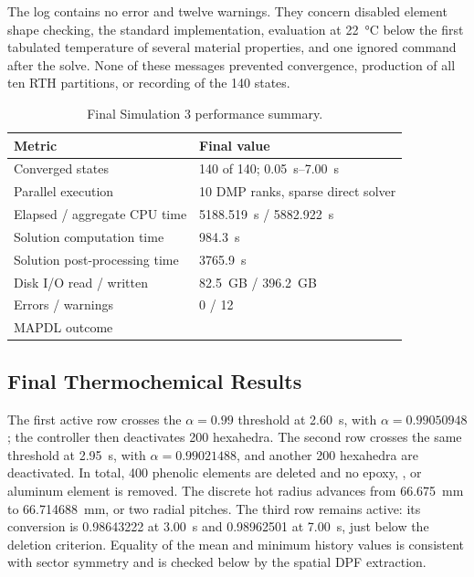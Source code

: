 \documentclass[oneside,openany]{amsdtx}
\begin{document}
The log contains no error and twelve warnings. They concern disabled element
shape checking, the standard  implementation, evaluation at
\SI{22}{\celsius} below the first tabulated temperature of several material
properties, and one ignored  command after the solve. None of
these messages prevented convergence, production of all ten RTH partitions,
or recording of the 140 states.

\begin{table}[H]
\centering
\small
\renewcommand{\arraystretch}{1.15}
\begin{tabular}{L{0.49\textwidth}L{0.37\textwidth}}
\toprule
\textbf{Metric} & \textbf{Final value} \\
\midrule
Converged states & 140 of 140; \SIrange{0.05}{7.00}{s} \\
Parallel execution & 10 DMP ranks, sparse direct solver \\
Elapsed / aggregate CPU time & \SI{5188.519}{s} / \SI{5882.922}{s} \\
Solution computation time & \SI{984.3}{s} \\
Solution post-processing time & \SI{3765.9}{s} \\
Disk I/O read / written & \SI{82.5}{GB} / \SI{396.2}{GB} \\
Errors / warnings & 0 / 12 \\
MAPDL outcome &  \\
\bottomrule
\end{tabular}
\caption{Final Simulation 3 performance summary.}
\label{tab:sim3-performance}
\end{table}

\subsection{Final Thermochemical Results}

The first active row crosses the \(\alpha=0.99\) threshold at
\SI{2.60}{s}, with \(\alpha=0.99050948\); the controller then deactivates 200
 hexahedra. The second row crosses the same threshold at
\SI{2.95}{s}, with \(\alpha=0.99021488\), and another 200 hexahedra are
deactivated. In total, 400 phenolic elements are deleted and no epoxy,
, or aluminum element is removed. The discrete hot radius advances
from \SI{66.675}{mm} to \SI{66.714688}{mm}, or two radial pitches. The third
row remains active: its conversion is 0.98643222 at \SI{3.00}{s} and
0.98962501 at \SI{7.00}{s}, just below the deletion criterion. Equality of
the mean and minimum history values is consistent with sector symmetry and is
checked below by the spatial DPF extraction.
\end{document}
